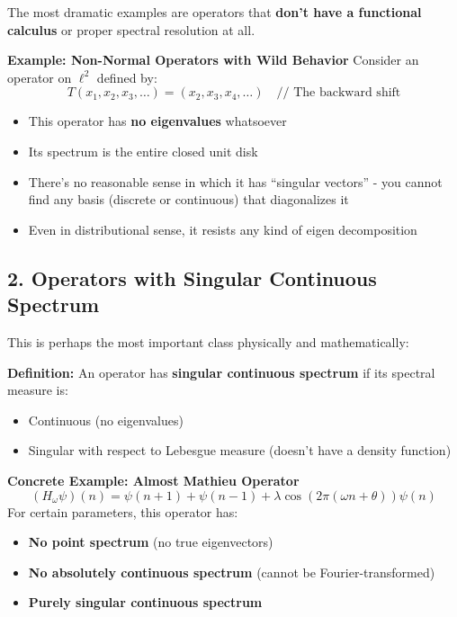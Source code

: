 \documentclass[aps,prl,reprint]{revtex4-2}
\begin{document}
The most dramatic examples are operators that \textbf{don't have a
functional calculus} or proper spectral resolution at all.

\textbf{Example: Non-Normal Operators with Wild Behavior} Consider an
operator on $\ell^2$ defined by: 
\begin{equation*}
T(x_1, x_2, x_3, \ldots) = (x_2, x_3, x_4, \ldots) \quad \text{// The
backward shift} 
\end{equation*}

\begin{itemize}
\item This operator has \textbf{no eigenvalues} whatsoever

\item Its spectrum is the entire closed unit disk

\item There's no reasonable sense in which it has ``singular vectors'' - you
cannot find any basis (discrete or continuous) that diagonalizes it

\item Even in distributional sense, it resists any kind of eigen
decomposition
\end{itemize}

\subsection*{2. Operators with Singular Continuous Spectrum}

This is perhaps the most important class physically and mathematically:

\textbf{Definition:} An operator has \textbf{singular continuous spectrum}
if its spectral measure is:

\begin{itemize}
\item Continuous (no eigenvalues)

\item Singular with respect to Lebesgue measure (doesn't have a density
function)
\end{itemize}

\textbf{Concrete Example: Almost Mathieu Operator} 
\begin{equation*}
(H_\omega\psi)(n) = \psi(n+1) + \psi(n-1) + \lambda \cos(2\pi(\omega n +
\theta))\psi(n) 
\end{equation*}
For certain parameters, this operator has:

\begin{itemize}
\item \textbf{No point spectrum} (no true eigenvectors)

\item \textbf{No absolutely continuous spectrum} (cannot be
Fourier-transformed)

\item \textbf{Purely singular continuous spectrum}
\end{itemize}
\end{document}
